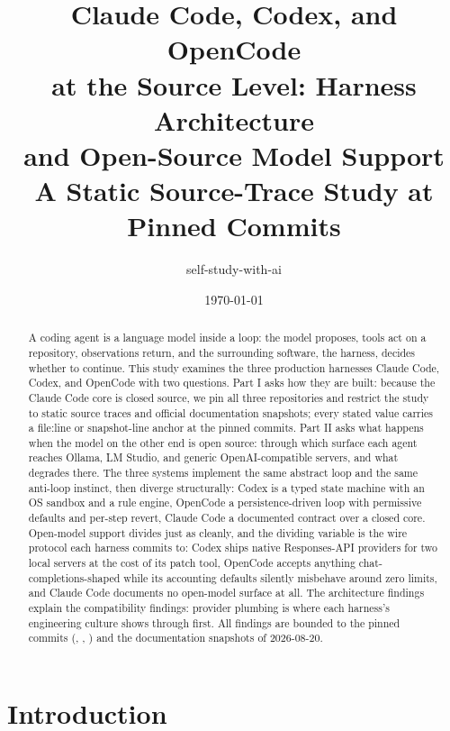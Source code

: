 \documentclass{article}
\title{Claude Code, Codex, and OpenCode\\
at the Source Level: Harness Architecture\\
and Open-Source Model Support\\
{\large A Static Source-Trace Study at Pinned Commits}}
\author{self-study-with-ai}
\date{\today}
\newcommand{\codex}[0]{Codex}
\newcommand{\occ}[0]{OpenCode}
\newcommand{\ccc}[0]{Claude Code}
\begin{document}
\maketitle

\begin{abstract}
A coding agent is a language model inside a loop: the model proposes,
tools act on a repository, observations return, and the surrounding
software, the harness, decides whether to continue. This study examines
the three production harnesses \ccc{}, \codex{}, and \occ{} with two
questions. Part I asks how they are built: because the \ccc{} core is
closed source, we pin all three repositories and restrict the study to
static source traces and official documentation snapshots; every stated
value carries a file:line or snapshot-line anchor at the pinned commits.
Part II asks what
happens when the model on the other end is open source: through which
surface each agent reaches Ollama, LM Studio, and generic
OpenAI-compatible servers, and what degrades there. The three systems
implement the same abstract loop and the same anti-loop instinct, then
diverge structurally: \codex{} is a typed state machine with an OS
sandbox and a rule engine, \occ{} a persistence-driven loop with
permissive defaults and per-step revert, \ccc{} a documented contract
over a closed core. Open-model support divides just as cleanly, and the
dividing variable is the wire protocol each harness commits to:
\codex{} ships native Responses-API providers for two local servers at
the cost of its patch tool, \occ{} accepts anything
chat-completions-shaped while its accounting defaults silently misbehave
around zero limits, and \ccc{} documents no open-model surface at all.
The architecture findings explain the compatibility findings: provider
plumbing is where each harness's engineering culture shows through
first. All findings are bounded to the pinned commits (,
, ) and the documentation snapshots of
2026-08-20.
\end{abstract}

\section{Introduction}
\end{document}
